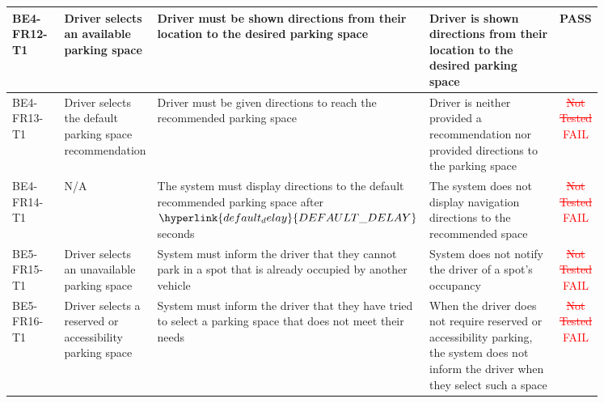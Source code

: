 \documentclass[12pt, titlepage]{article}
\begin{document}
\begin{center}
\begin{tabular}{|p{0.10\linewidth}|p{0.15\linewidth}|p{0.30\linewidth}|p{0.30\linewidth}|c|} 
\hline
BE4-FR12-T1 & Driver selects an available parking space & Driver must be shown
directions from their location to the desired parking space & Driver is shown
directions from their location to the desired parking space &
\textcolor{OliveGreen}{PASS} \\
\hline
BE4-FR13-T1 & Driver selects the default parking space recommendation & Driver
must be given directions to reach the recommended parking space & Driver is
neither provided a recommendation nor provided directions to the parking space &
\textcolor{red}{\st{Not Tested} FAIL} \\ 
\hline
BE4-FR14-T1 & N/A & The system must display directions to the default
recommended parking space after $\hyperlink{default_delay}{DEFAULT\_DELAY}$
seconds & The system does not display navigation directions to the recommended
space & \textcolor{red}{\st{Not Tested} FAIL} \\
\hline
BE5-FR15-T1 & Driver selects an unavailable parking space & System must inform
the driver that they cannot park in a spot that is already occupied by another
vehicle & System does not notify the driver of a spot's occupancy &
\textcolor{red}{\st{Not Tested} FAIL} \\
\hline
BE5-FR16-T1 & Driver selects a reserved or accessibility parking space & System
must inform the driver that they have tried to select a parking space that does
not meet their needs & When the driver does not require reserved or
accessibility parking, the system does not inform the driver when they select
such a space & \textcolor{red}{\st{Not Tested} FAIL} \\
\hline
\end{tabular}
\end{center}
\end{document}
